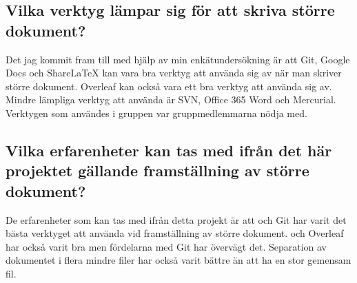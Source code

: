 \subsection{Vilka verktyg lämpar sig för att skriva större dokument?}
Det jag kommit fram till med hjälp av min enkätundersökning är att Git, Google Docs och ShareLaTeX kan vara bra verktyg att använda sig av när man skriver större dokument. Overleaf kan också vara ett bra verktyg att använda sig av. Mindre lämpliga verktyg att använda är SVN, Office 365 Word och Mercurial. Verktygen som användes i gruppen var gruppmedlemmarna nödja med.

\subsection{Vilka erfarenheter kan tas med ifrån det här projektet gällande framställning av större dokument?}
De erfarenheter som kan tas med ifrån detta projekt är att \latex och Git har varit det bästa verktyget att använda vid framställning av större dokument. \latex och Overleaf har också varit bra men fördelarna med Git har övervägt det. Separation av dokumentet i flera mindre filer har också varit bättre än att ha en stor gemensam fil.

